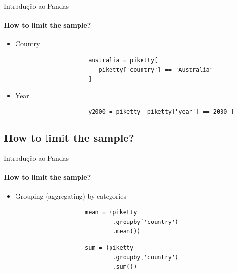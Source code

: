 \documentclass[notes,11pt, aspectratio=169, xcolor=table]{beamer}
\begin{document}
        \begin{frame}[fragile=singleslide]{Introdução ao Pandas}
        \framesubtitle{How to limit the sample?}
            
             \begin{itemize}
    
                \item Country
                    \begin{verbatim}
                     australia = piketty[
                        piketty['country'] == "Australia"
                     ]
                    \end{verbatim}

                \item Year
                    \begin{verbatim}
                     y2000 = piketty[ piketty['year'] == 2000 ]
                    \end{verbatim}
                    
            \end{itemize}             

    \end{frame}        

        \subsection{How to limit the sample?}
        
        \begin{frame}[fragile=singleslide]{Introdução ao Pandas}
        \framesubtitle{How to limit the sample?}
            
             \begin{itemize}
    
                \item Grouping (aggregating) by categories
                    \begin{verbatim}
                    mean = (piketty
                            .groupby('country')
                            .mean())
                    \end{verbatim}
                    \begin{verbatim}
                    sum = (piketty
                            .groupby('country')
                            .sum())
                    \end{verbatim}
                    
            \end{itemize}             

    \end{frame}           
    
    
\end{document}
